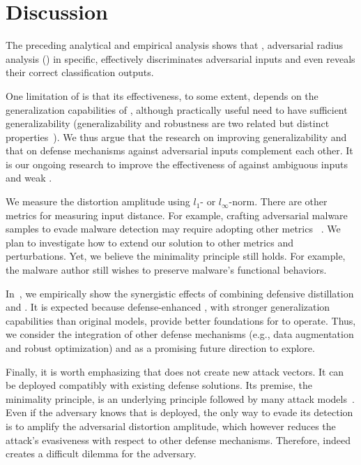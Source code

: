 \section{Discussion}
\label{sec:discussion}

The preceding analytical and empirical analysis shows that \system, adversarial radius analysis (\ara) in specific, effectively discriminates adversarial inputs and even reveals their correct classification outputs.

One limitation of \system is that its effectiveness, to some extent, depends on the generalization capabilities of \dnns, although practically useful \dnns need to have sufficient generalizability (\dnn generalizability and robustness are two related but distinct properties~\cite{Feng:2016:arXiv}). We thus argue that the research on improving \dnn generalizability and that on defense mechanisms against adversarial inputs complement each other. It is our ongoing research to improve the effectiveness of \system against ambiguous inputs and weak \dnn.



We measure the distortion amplitude using $l_1$- or $l_\infty$-norm. There are other metrics for measuring input distance. For example, crafting adversarial malware samples to evade malware detection may require adopting other metrics ~\cite{Fogla:2006:ccs,Grosse:arxiv:2016}. We plan to investigate how to extend our solution to other metrics and perturbations. Yet, we believe the minimality principle still holds. For example, the malware author still wishes to preserve malware's functional behaviors.


In~, we empirically show the synergistic effects of combining defensive distillation and \system. It is expected because defense-enhanced \dnns, with stronger generalization capabilities than original models, provide better foundations for \ara to operate. Thus, we consider the integration of other defense mechanisms (e.g., data augmentation and robust optimization) and \system as a promising future direction to explore.

%


 Finally, it is worth emphasizing that \system does not create new attack vectors. It can be deployed compatibly with existing defense solutions. Its premise, the minimality principle, is an underlying principle followed by many attack models~\cite{Goodfellow:2014:arxiv,Huang:2015:arxiv,Papernot:2016:eurosp,Carlini:2016:arXiv}. Even if the adversary knows that \system is deployed, the only way to evade its detection is to amplify the adversarial distortion amplitude, which however reduces the attack's evasiveness with respect to other defense mechanisms. Therefore, \system indeed creates a difficult dilemma for the adversary.
